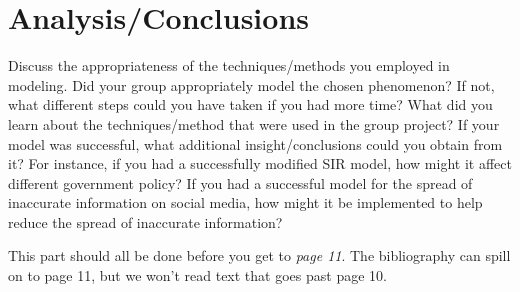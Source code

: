 \documentclass[11pt]{amsart}
\begin{document}
\section{Analysis/Conclusions}

Discuss the appropriateness of the techniques/methods you employed in modeling. Did your group appropriately model the chosen phenomenon? If not, what different steps could you have taken if you had more time? What did you learn about the techniques/method that were used in the group project? If your model was successful, what additional insight/conclusions could you obtain from it? For instance, if you had a successfully modified SIR model, how might it affect different government policy? If you had a successful model for the spread of inaccurate information on social media, how might it be implemented to help reduce the spread of inaccurate information?



This part should all be done before you get to \emph{page 11}.  The bibliography can spill on to page 11, but we won't read text that goes past page 10.


\FloatBarrier %
\newpage


\end{document}
